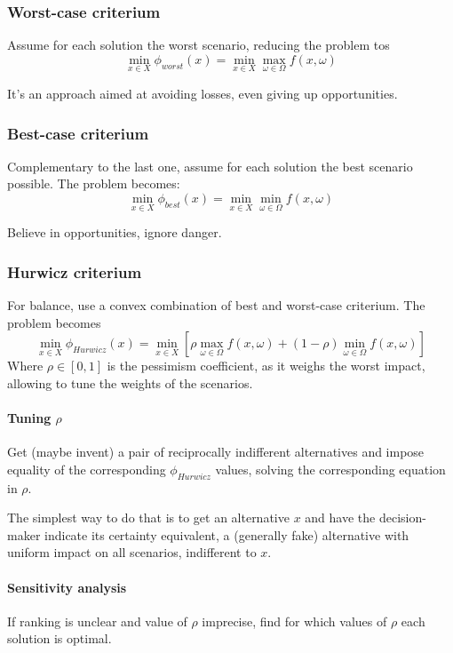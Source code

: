 \subsubsection{Worst-case criterium}

Assume for each solution the worst scenario, reducing the problem tos
$$ \min_{x \in X} \phi_{worst} (x) = \min_{x \in X} \max_{\omega \in \Omega} f(x, \omega) $$

It's an approach aimed at avoiding losses, even giving up opportunities. 

\subsubsection{Best-case criterium}

Complementary to the last one, assume for each solution the best scenario possible. The problem becomes: 
$$ \min_{x \in X} \phi_{best} (x) = \min_{x \in X} \min_{\omega \in \Omega} f(x, \omega) $$

Believe in opportunities, ignore danger.

\subsubsection{Hurwicz criterium}

For balance, use a convex combination of best and worst-case criterium. The problem becomes
$$ \min_{x \in X} \phi_{Hurwicz} (x) = \min_{x \in X} \left[\rho \max_{\omega \in \Omega} f(x, \omega) + (1 - \rho) \min_{\omega \in \Omega} f(x, \omega) \right]$$
Where $\rho \in [0,1]$ is the pessimism coefficient, as it weighs the worst impact, allowing to tune the weights of the scenarios.

\paragraph{Tuning $\rho$} Get (maybe invent) a pair of reciprocally indifferent alternatives and impose equality of the corresponding $\phi_{Hurwicz}$ values, solving the corresponding equation in $\rho$.

The simplest way to do that is to get an alternative $x$ and have the decision-maker indicate its certainty equivalent, a (generally fake) alternative with uniform impact on all scenarios, indifferent to $x$.

\paragraph{Sensitivity analysis} If ranking is unclear and value of $\rho$ imprecise, find for which values of $\rho$ each solution is optimal.

